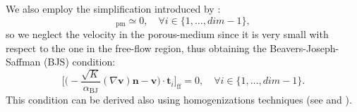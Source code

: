 \begin{itemize}
	We also employ the simplification introduced by \textcite{inter:bjs}:
	\begin{equation}
		[\mathbf{v} \cdot \mathbf{t}_i]_\text{pm} \simeq 0, \quad \forall i \in 
		\{1, 
		\dots, dim-1\},
	\end{equation}
	so we neglect the velocity in the porous-medium since it is very small with 
	respect to the one in the free-flow region, thus obtaining the 
	Beavers-Joseph-Saffman (BJS) condition:
	\begin{equation} \label{eq:bjs}
		\bigg[ \bigg( -\frac{\sqrt{K}}{\alpha_\text{BJ}} (\nabla \mathbf{v}) 
		\mathbf{n} - \mathbf{v} \bigg) \cdot \mathbf{t}_i \bigg]_\text{ff} = 0, 
		\quad \forall i \in \{1, \dots, dim - 1\}.
	\end{equation}
	This condition can be derived also using homogenizations techniques (see \cite{bjs:homo} and \cite{intro:disca2009}).
\end{itemize} 
